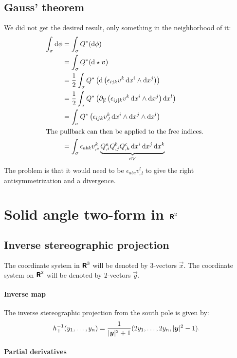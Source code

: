 \documentclass[11pt, english, fleqn, DIV=15, headinclude, BCOR=1cm]{scrartcl}
\begin{document}
\subsection{Gauss' theorem}

We did not get the desired result, only something in the neighborhood of it:
\begin{align*}
    \int_\sigma \dif \phi
    &= \int_\sigma Q^*(\dif \phi) \\
    &= \int_\sigma Q^*(\dif \hodge \vec v) \\
    &= \frac 12 \int_\sigma Q^*\del{\dif \del{\epsilon_{ijk} v^k \dif x^i \wedge \dif
    x^j}} \\
    &= \frac12 \int_\sigma Q^*\del{\partial_{[l} \del{\epsilon_{ij]k} v^k \dif x^i \wedge \dif
    x^j} \dif x^l} \\
    &= \int_\sigma Q^*\del{\epsilon_{ijk} v^k_{,l} \dif x^i \wedge \dif
    x^j \wedge \dif x^l} \\
    \intertext{%
        The pullback can then be applied to the free indices.
    }
    &= \int_\sigma \epsilon_{abk} v^k_{,c} \underbrace{Q^a_{,i} Q^b_{,j} Q^c_{,k} \dif x^i
    \dif x^j \dif x^k}_{\dif V}
\end{align*}
The problem is that it would need to be $\epsilon_{abc} v^l_{,l}$ to give the
right antisymmetrization and a divergence.

\section{Solid angle two-form in $\text{\bfseries\sffamily R}^2$}
\label{homework:2}

\subsection{Inverse stereographic projection}

The coordinate system in $\text{\bfseries\sffamily R}^3$ will be denoted by 3-vectors $\vec x$. The
coordinate system on $\text{\bfseries\sffamily R}^2$ will be denoted by 2-vectors $\vec y$.

\paragraph{Inverse map}

The inverse stereographic projection from the south pole is given by:
\parencite{wikipedia/stereographische_Projektion}
\[
    h_+^{-1}(y_1, \ldots, y_n) = \frac{1}{|\boldsymbol{y}|^2 + 1} (2 y_1, \ldots, 2y_n,
    |\boldsymbol{y}|^2 - 1).
\]

\paragraph{Partial derivatives}
\end{document}

